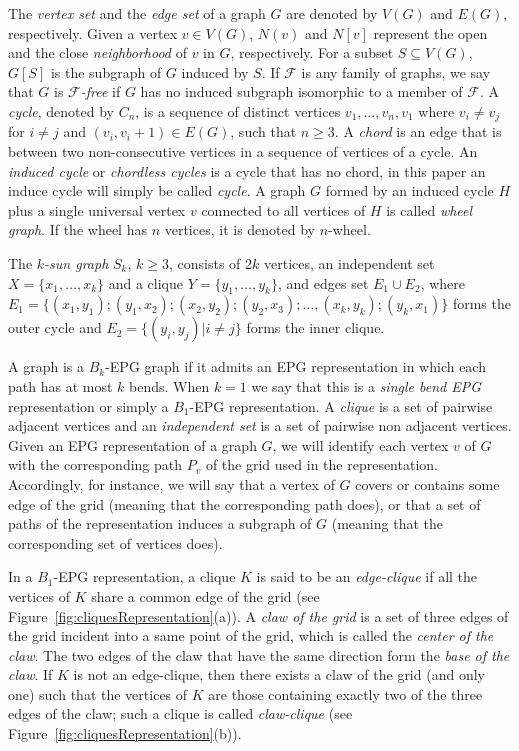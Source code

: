 The \textit{vertex set} and the \textit{edge set} of a graph $G$ are denoted by $V(G)$ and $E(G)$, respectively.  Given a vertex $v\in V(G)$,  $N(v)$ and $N[v]$ represent the open and the close
 \textit{neighborhood} of $v$ in $G$, respectively. 
For a subset $S \subseteq V(G)$,  $G[S]$ is the subgraph of $G$ induced by $S$.
 If $\mathcal{F}$ is any family of graphs, we say that  $G$ is  \textit{$\mathcal{F}$-free} if $G$ has no induced subgraph isomorphic to a member of $\mathcal{F}$.
 A \textit{cycle},  denoted by $C_n$,  is a sequence of distinct
vertices $v_1, \dots , v_n, v_1$  where $v_i \neq v_j$ for $i \neq j$ and $(v_i, v_i + 1) \in E(G)$, such that
$n \geq 3$. A \textit{chord} is an edge that is between two non-consecutive vertices in a sequence of vertices of a cycle. An \textit{induced cycle}  or \textit{chordless cycles} is a cycle that has no chord, in this paper an induce cycle will simply be called  \textit{cycle}. A graph $G$ formed by an induced cycle $H$ plus  a single universal vertex $v$ connected to all vertices of $H$
is called \textit{wheel graph}. If the wheel has $n$ vertices, it is denoted by $n$-wheel. 

The $k$\textit{-sun graph }$S_k$, $k \geq 3$, consists of
$2k$ vertices, an independent set $X = \{x_1, \dots, x_k\}$ and a clique $Y = \{y_1, \dots, y_k\}$, and edges set $E_1 \cup E_2$, where $E_ 1=\{ (x_1,y_1); (y_1, x_2); (x_2, y_2); (y_2, x_3); \dots , (x_k, y_k); (y_k, x_1) \}$ forms the outer cycle and $E_2= \{(y_i, y_j) |i\neq j\}$ forms the inner clique.

A graph is a $ B_k$-EPG graph if it admits an EPG representation in which each path has at most $k$ bends.  When $ k = 1 $ we say that this is a \emph{single bend EPG} representation or simply a $B_1$-EPG representation.
A \textit{clique} is a set of pairwise adjacent vertices and
an \textit{independent set} is a set of pairwise non adjacent vertices.
Given an EPG representation of a graph $G$, we will identify each vertex $v$ of $G$ with the corresponding path $P_{v}$ of the grid used in the representation. Accordingly, for instance, we will say that a vertex of $G$ covers or contains some edge of the grid (meaning that the corresponding path does), or that a set of paths of the representation
induces a subgraph of $G$ (meaning that the corresponding set of vertices does). 

In  a $B_1$-EPG representation, a clique $K$  is said to be
 an \textit{edge-clique} if all the vertices of $K$ share a common edge of the grid (see Figure~\ref{fig:cliquesRepresentation}(a)).
 A \textit{claw of the grid} is a set of three edges of the grid incident into a same point of the grid, which is called
  the \textit{center of the claw}. The two edges of the claw that have the same direction form
    the \textit{ base of the claw}. If $K$ is not an edge-clique, then there exists
    a claw of the grid (and only one) such that the vertices of $K$ are those containing exactly two of the three edges of the claw; such a  clique is called  \textit{claw-clique} \cite{golumbic2009} (see Figure~\ref{fig:cliquesRepresentation}(b)).

